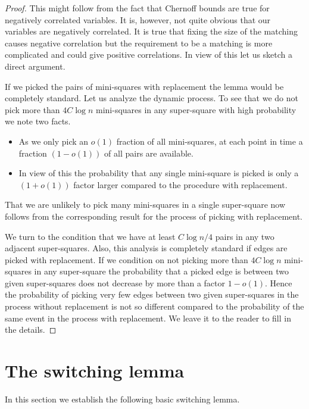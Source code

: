\documentclass{article}\usepackage[a4paper,margin=20mm]{geometry}
\begin{document}
\begin{proof}
This might follow
from the fact that Chernoff bounds are true for
negatively correlated variables.  It is, however,
not quite obvious that
our variables are negatively correlated.  It is true that
fixing the size of the matching causes negative correlation
but the requirement to be a matching is more complicated
and could give positive correlations.  In view of this
let us sketch a direct argument.

If we picked the pairs of mini-squares
with replacement the lemma would be completely standard.  
Let us analyze the dynamic process. To see
that we do not pick more than $4C \log n$ mini-squares
in any super-square with high probability we note two
facts.

\begin{itemize}

\item As we only pick an $o(1)$ fraction of all mini-squares,
at each point in time a fraction $(1-o(1))$ of all pairs
are available.

\item In view of this the probability that any
single mini-square is picked is only a $(1+o(1))$
factor larger compared to the procedure 
with replacement.

\end{itemize}
That we are unlikely to pick many mini-squares in a single
super-square now follows from the corresponding result
for the process of picking with replacement.

We turn to the condition that we have at 
least $C \log n /4$ pairs in any two adjacent super-squares.
Also, this analysis is completely standard if edges are picked with
replacement.  If we condition on not picking more than $4C \log n$
mini-squares in any super-square the probability that a picked edge is between
two given super-squares does not decrease by more than a factor
$1-o(1)$.  Hence the probability of picking very few edges
between two given super-squares in the process without replacement 
is not so different compared to the probability of
the same event in the process with replacement.
We leave it to the reader to fill in the details.
\end{proof}

\section{The switching lemma} \label{sec:switch}
In this section we establish the following basic
switching lemma.
\end{document}
